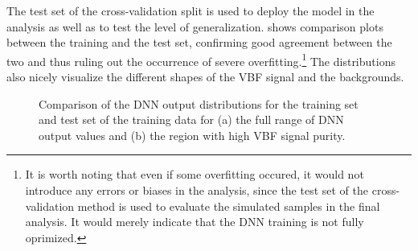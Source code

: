 
The test set of the cross-validation split is used to deploy the model in the analysis as well as to test the level of generalization.
 shows comparison plots between the training and the test set, confirming good agreement between the two and thus ruling out the occurrence of severe overfitting.\footnote{It is worth noting that even if some overfitting occured, it would not introduce any errors or biases in the analysis, since the test set of the cross-validation method is used to evaluate the simulated samples in the final analysis. It would merely indicate that the DNN training is not fully oprimized.}
The distributions also nicely visualize the different shapes of the VBF signal and the backgrounds.
\captionsetup[subfloat]{captionskip=7pt} %
\begin{figure}[t]
    \caption{Comparison of the DNN output distributions for the training set and test set of the training data for (a) the full range of DNN output values and (b) the region with high VBF signal purity.}
    \label{fig:dnn-train-vs-test}
\end{figure}

